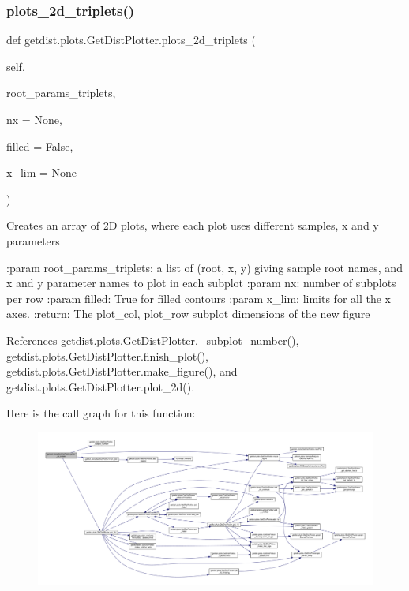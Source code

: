 \subsubsection{\texorpdfstring{plots\+\_\+2d\+\_\+triplets()}{plots\_2d\_triplets()}}
{\footnotesize\ttfamily def getdist.\+plots.\+Get\+Dist\+Plotter.\+plots\+\_\+2d\+\_\+triplets (\begin{DoxyParamCaption}\item[{}]{self,  }\item[{}]{root\+\_\+params\+\_\+triplets,  }\item[{}]{nx = {\ttfamily None},  }\item[{}]{filled = {\ttfamily False},  }\item[{}]{x\+\_\+lim = {\ttfamily None} }\end{DoxyParamCaption})}

\begin{DoxyVerb}Creates an array of 2D plots, where each plot uses different samples, x and y parameters

:param root_params_triplets: a list of (root, x, y) giving sample root names, and x and y parameter names to plot in each subplot
:param nx: number of subplots per row
:param filled:  True for filled contours
:param x_lim: limits for all the x axes.
:return: The plot_col, plot_row subplot dimensions of the new figure
\end{DoxyVerb}
 

References getdist.\+plots.\+Get\+Dist\+Plotter.\+\_\+subplot\+\_\+number(), getdist.\+plots.\+Get\+Dist\+Plotter.\+finish\+\_\+plot(), getdist.\+plots.\+Get\+Dist\+Plotter.\+make\+\_\+figure(), and getdist.\+plots.\+Get\+Dist\+Plotter.\+plot\+\_\+2d().

Here is the call graph for this function\+:
\nopagebreak
\begin{figure}[H]
\begin{center}
\leavevmode
\includegraphics[width=350pt]{classgetdist_1_1plots_1_1GetDistPlotter_a003f6bc9220702f977aaaa73c64b1cb3_cgraph}
\end{center}
\end{figure}
\mbox{\label{classgetdist_1_1plots_1_1GetDistPlotter_a331da209c29a04929d2e5fb97fc1e8bb}} 
